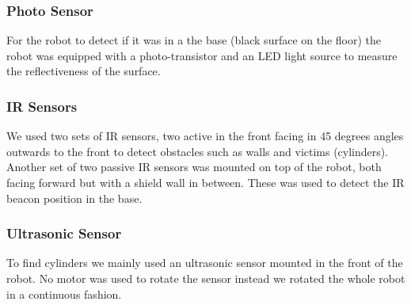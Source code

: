 \subsubsection{Photo Sensor}
For the robot to detect if it was in a the base (black surface on the floor) the robot was equipped with a photo-transistor and an LED light source to measure the reflectiveness of the surface.

\subsubsection{IR Sensors}
We used two sets of IR sensors, two active in the front facing in 45 degrees angles outwards to the front to detect obstacles such as walls and victims (cylinders). Another set of two passive IR sensors was mounted on top of the robot, both facing forward but with a shield wall in between. These was used to detect the IR beacon position in the base.

\subsubsection{Ultrasonic Sensor}
To find cylinders we mainly used an ultrasonic sensor mounted in the front of the robot. No motor was used to rotate the sensor instead we rotated the whole robot in a continuous fashion.